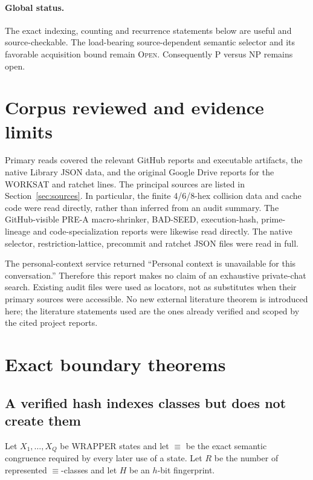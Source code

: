 \documentclass[11pt]{article}
\newcommand{\Open}{\textsc{Open}}
\begin{document}
\paragraph{Global status.}
The exact indexing, counting and recurrence statements below are useful and
source-checkable.  The load-bearing source-dependent semantic selector and its
favorable acquisition bound remain \Open.  Consequently P versus NP remains
open.

\section{Corpus reviewed and evidence limits}

Primary reads covered the relevant GitHub reports and executable artifacts,
the native Library JSON data, and the original Google Drive reports for the
WORKSAT and ratchet lines.  The principal sources are listed in
Section~\ref{sec:sources}.  In particular, the finite 4/6/8-hex collision data
and cache code were read directly, rather than inferred from an audit summary.
The GitHub-visible PRE-A macro-shrinker, BAD-SEED, execution-hash, prime-lineage
and code-specialization reports were likewise read directly.  The native
selector, restriction-lattice, precommit and ratchet JSON files were read in
full.

The personal-context service returned ``Personal context is unavailable for
this conversation.''  Therefore this report makes no claim of an exhaustive
private-chat search.  Existing audit files were used as locators, not as
substitutes when their primary sources were accessible.  No new external
literature theorem is introduced here; the literature statements used are the
ones already verified and scoped by the cited project reports.

\section{Exact boundary theorems}

\subsection{A verified hash indexes classes but does not create them}

Let $X_1,\ldots,X_Q$ be WRAPPER states and let $\equiv$ be the exact semantic
congruence required by every later use of a state.  Let $R$ be the number of
represented $\equiv$-classes and let $H$ be an $h$-bit fingerprint.
\end{document}
